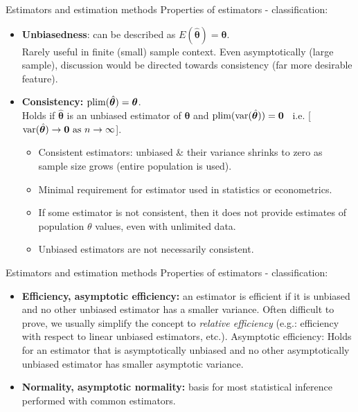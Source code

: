\documentclass{beamer}
\begin{document}
\begin{frame}{Estimators and estimation methods}
Properties of estimators - classification:
\medskip
\begin{itemize}
\item \textbf{Unbiasedness}: can be described as $E(\hat{\bm{\theta}})= \bm{\theta}$. \\Rarely useful in finite (small) sample context. Even asymptotically (large sample), discussion would be directed towards consistency (far more desirable feature).
\medskip
\item \textbf{Consistency:} $\textnormal{plim}(\hat{\bm{\theta}}) = \bm{\theta}$. \\Holds if $\hat{\bm{\theta}}$ is an unbiased estimator of $\bm{\theta}$ and $\textnormal{plim}(\textnormal{var}(\hat{\bm{\theta}}))=\bm{0}$ ~i.e. [$\textnormal{var}(\hat{\bm{\theta}}) \rightarrow \bm{0} \textnormal{ as } n \rightarrow \infty$].
\begin{itemize}
\item Consistent estimators: unbiased \& their variance shrinks to zero as sample size grows (entire population is used).
\item Minimal requirement for estimator used in statistics or econometrics.
\item If some estimator is not consistent, then it does not provide estimates of population $\theta$ values, even with unlimited data.
\item Unbiased estimators are not necessarily consistent. 
\end{itemize}
\end{itemize}
\end{frame}
\begin{frame}{Estimators and estimation methods}
Properties of estimators - classification:
\medskip
\begin{itemize}
\item \textbf{Efficiency, asymptotic efficiency:} an estimator is efficient if it is unbiased and no other unbiased estimator has a smaller variance. Often difficult to prove, we usually simplify the concept to \textit{relative efficiency} (e.g.: efficiency with respect to linear unbiased estimators, etc.). Asymptotic efficiency: Holds for an estimator that is asymptotically unbiased and no other asymptotically unbiased estimator has smaller asymptotic variance.
\medskip
\item \textbf{Normality, asymptotic normality:} basis for most statistical inference performed with common estimators. 
\end{itemize}
\end{frame}
\end{document}

